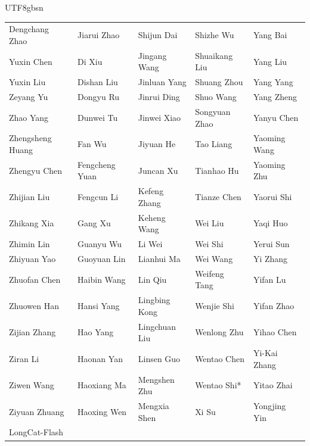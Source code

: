 \begin{CJK}{UTF8}{gbsn}
\begin{center}
\begin{tabular}{p{}p{}p{}p{}p{}}
Dengchang Zhao & Jiarui Zhao & Shijun Dai & Shizhe Wu & Yang Bai \\
Yuxin Chen & Di Xiu & Jingang Wang & Shuaikang Liu & Yang Liu \\
Yuxin Liu & Dishan Liu & Jinluan Yang & Shuang Zhou & Yang Yang \\
Zeyang Yu & Dongyu Ru & Jinrui Ding & Shuo Wang & Yang Zheng \\
Zhao Yang & Dunwei Tu & Jinwei Xiao & Songyuan Zhao & Yanyu Chen \\
Zhengsheng Huang & Fan Wu & Jiyuan He & Tao Liang & Yaoming Wang \\
Zhengyu Chen & Fengcheng Yuan & Juncan Xu & Tianhao Hu & Yaoming Zhu \\
Zhijian Liu & Fengcun Li & Kefeng Zhang & Tianze Chen & Yaorui Shi \\
Zhikang Xia & Gang Xu & Keheng Wang & Wei Liu & Yaqi Huo \\
Zhimin Lin & Guanyu Wu & Li Wei & Wei Shi & Yerui Sun \\
Zhiyuan Yao & Guoyuan Lin & Lianhui Ma & Wei Wang & Yi Zhang \\
Zhuofan Chen & Haibin Wang & Lin Qiu & Weifeng Tang & Yifan Lu \\
Zhuowen Han & Hansi Yang & Lingbing Kong & Wenjie Shi & Yifan Zhao \\
Zijian Zhang & Hao Yang & Lingchuan Liu & Wenlong Zhu & Yihao Chen \\
Ziran Li & Haonan Yan & Linsen Guo & Wentao Chen & Yi-Kai Zhang \\
Ziwen Wang & Haoxiang Ma & Mengshen Zhu & Wentao Shi* & Yitao Zhai \\
Ziyuan Zhuang & Haoxing Wen & Mengxia Shen & Xi Su & Yongjing Yin \\
LongCat-Flash \\
\end{tabular}

\end{center}

\end{CJK}
